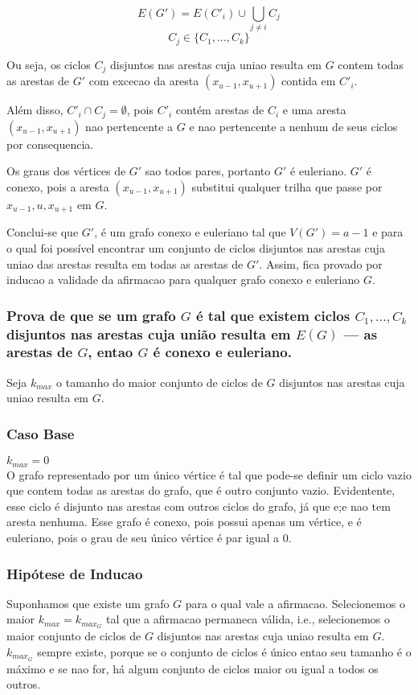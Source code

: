 \documentclass{article}
\begin{document}
$$
E(G') =    E(C'_i) \cup \bigcup_{j \neq i} C_j 
$$
$$
C_j \in \{C_1, \ldots, C_k\}
$$

Ou seja, os ciclos $C_j$ disjuntos nas arestas cuja uniao resulta em $G$ contem todas as arestas de $G'$ com excecao da aresta $(x_{u-1}, x_{u+1})$ contida em $C'_i$.

Além disso, $C'_i \cap C_j = \emptyset$, pois $C'_i$ contém arestas de $C_i$ e uma aresta $(x_{u-1}, x_{u+1})$ nao pertencente a $G$ e nao pertencente a nenhum de seus ciclos por consequencia.

Os graus dos vértices de $G'$ sao todos pares, portanto $G'$ é euleriano. $G'$ é conexo, pois a aresta $(x_{u-1}, x_{u+1})$ substitui qualquer trilha que passe por $ x_{u-1}, u ,  x_{u+1}$ em $G$.

Conclui-se que $G'$, é um grafo conexo e euleriano tal que $V(G') = a - 1$ e para o qual foi possível encontrar um conjunto de ciclos disjuntos nas arestas cuja uniao das arestas resulta em todas as arestas de $G'$. Assim, fica provado por inducao a validade da afirmacao para qualquer grafo conexo e euleriano $G$.

 
  \subsubsection{Prova de que se um grafo  $G$ é tal que existem ciclos $C_1, \ldots, C_k$ disjuntos nas arestas cuja união resulta em $E(G)$ — as arestas de $G$, entao $G$ é conexo e euleriano.}
 
Seja $k_{max}$ o tamanho do maior conjunto de ciclos de $G$ disjuntos nas arestas cuja uniao resulta em $G$. 
 
 \subsubsection*{Caso Base}
 $k_{max} = 0$ \\
O grafo representado por um único vértice é tal que pode-se definir um ciclo vazio que contem todas as arestas do grafo, que é outro conjunto vazio. Evidentente, esse ciclo é disjunto nas arestas com outros ciclos do grafo, já que e;e nao tem aresta nenhuma. Esse grafo é conexo, pois possui apenas um vértice, e é euleriano, pois o grau de seu único vértice é par igual a $0$.
 
 \subsubsection*{Hipótese de Inducao}
 Suponhamos que existe um grafo $G$ para o qual vale a afirmacao. Selecionemos o maior $k_{max} = k_{max_G}$ tal que a afirmacao permaneca válida, i.e., selecionemos o maior conjunto de ciclos de $G$ disjuntos nas arestas cuja uniao resulta em $G$. $k_{max_G}$ sempre existe, porque se o conjunto de ciclos é único entao seu tamanho é o máximo e se nao for, há algum  conjunto de ciclos maior ou igual a todos os outros. 
 
\end{document}
